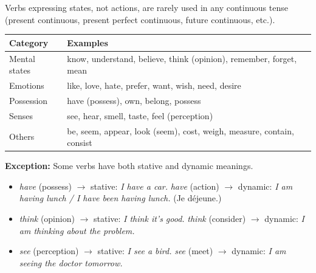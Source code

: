 \documentclass[11pt]{article}
\begin{document}
\begin{attention}
Verbs expressing states, not actions, are rarely used in any continuous tense (present continuous, present perfect continuous, future continuous, etc.).
\begin{center}
\begin{tabularx}{\linewidth}{|l|X|}\hline
\textbf{Category} & \textbf{Examples} \\ \hline
Mental states & know, understand, believe, think (opinion), remember, forget, mean \\
Emotions & like, love, hate, prefer, want, wish, need, desire \\
Possession & have (possess), own, belong, possess \\
Senses & see, hear, smell, taste, feel (perception) \\
Others & be, seem, appear, look (seem), cost, weigh, measure, contain, consist \\ \hline
\end{tabularx}
\end{center}
\textbf{Exception:} Some verbs have both stative and dynamic meanings.
\begin{itemize}
    \item \emph{have} (possess) $\rightarrow$ stative: \emph{I have a car.} \quad \emph{have} (action) $\rightarrow$ dynamic: \emph{I am having lunch / I have been having lunch.} (Je déjeune.)
    \item \emph{think} (opinion) $\rightarrow$ stative: \emph{I think it's good.} \quad \emph{think} (consider) $\rightarrow$ dynamic: \emph{I am thinking about the problem.}
    \item \emph{see} (perception) $\rightarrow$ stative: \emph{I see a bird.} \quad \emph{see} (meet) $\rightarrow$ dynamic: \emph{I am seeing the doctor tomorrow.}
\end{itemize}
\end{attention}
\end{document}
